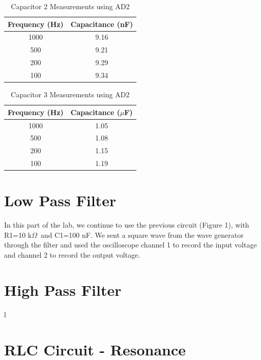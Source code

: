 \documentclass{article}
\renewcommand{\O}{\(\Omega\)}
\begin{document}
\begin{table}[H]
    \centering
    \begin{tabular}{c|c}
        Frequency (Hz) & Capacitance (nF)\\
        \hline
        1000 & 9.16\\
        500 & 9.21\\
        200 & 9.29\\
        100 & 9.34
    \end{tabular}
    \caption{Capacitor 2 Measurements using AD2}
\end{table}

\begin{table}[H]
    \centering
    \begin{tabular}{c|c}
        Frequency (Hz) & Capacitance (\(\mu\)F)\\
        \hline
        1000 & 1.05\\
        500 & 1.08\\
        200 & 1.15\\
        100 & 1.19
    \end{tabular}
    \caption{Capacitor 3 Measurements using AD2}
\end{table}

\section{Low Pass Filter}
In this part of the lab, we continue to use the previous circuit (Figure 1), with R1=10 k\O\ and C1=100 nF. We sent a square wave from the wave generator through the filter and used the oscilloscope channel 1 to record the input voltage and channel 2 to record the output voltage. 

\section{High Pass Filter}  l


\section{RLC Circuit - Resonance}
\end{document}
